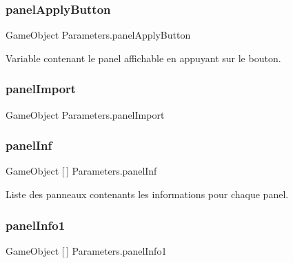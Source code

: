 \subsubsection{\texorpdfstring{panel\+Apply\+Button}{panelApplyButton}}
{\footnotesize\ttfamily Game\+Object Parameters.\+panel\+Apply\+Button\hspace{0.3cm}{\ttfamily [private]}}



Variable contenant le panel affichable en appuyant sur le bouton. 

\mbox{\label{class_parameters_a9039782e9b57b1cca98f109c8bd22928}} 
\subsubsection{\texorpdfstring{panel\+Import}{panelImport}}
{\footnotesize\ttfamily Game\+Object Parameters.\+panel\+Import}

\mbox{\label{class_parameters_a8548a9cf76e7157e3722468f7fa4c275}} 
\subsubsection{\texorpdfstring{panel\+Inf}{panelInf}}
{\footnotesize\ttfamily Game\+Object \mbox{[}$\,$\mbox{]} Parameters.\+panel\+Inf\hspace{0.3cm}{\ttfamily [private]}}



Liste des panneaux contenants les informations pour chaque panel. 

\mbox{\label{class_parameters_a21e4cca4e061b650741354680361136c}} 
\subsubsection{\texorpdfstring{panel\+Info1}{panelInfo1}}
{\footnotesize\ttfamily Game\+Object \mbox{[}$\,$\mbox{]} Parameters.\+panel\+Info1\hspace{0.3cm}{\ttfamily [private]}}



